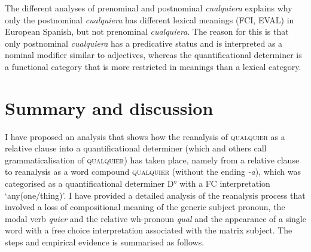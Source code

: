 The different analyses of prenominal and postnominal \textit{cualquiera} explains why only the postnominal \textit{cualquiera} has different lexical meanings (FCI, EVAL) in European Spanish, but not prenominal \textit{cualquiera}. The reason for this is that only postnominal \textit{cualquiera} has a predicative status and is interpreted as a nominal modifier similar to adjectives, whereas the quantificational determiner is a functional category that is more restricted in meanings than a lexical category.

\section{{Summary} {and} {discussion}} \label{sec:5.4}

I have proposed an analysis that shows how the reanalysis of \textsc{qualquier} as a relative clause into a quantificational determiner (which \citealt{cp2009} and others call grammaticalisation of \textsc{qualquier}) has taken place, namely from a relative clause to reanalysis as a word compound \textsc{qualquier} (without the ending \textit{-a}), which was categorised as a quantificational determiner D° with a FC interpretation ‘any(one/thing)’. I have provided a detailed analysis of the reanalysis process that involved a loss of compositional meaning of the generic subject pronoun, the modal verb \textit{quier} and the relative wh-pronoun \textit{qual} and the appearance of a single word with a free choice interpretation associated with the matrix subject. The steps and empirical evidence is summarised as follows.



